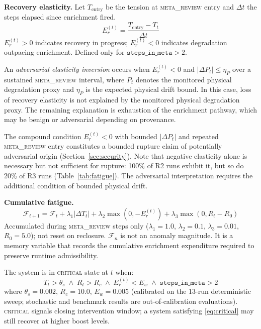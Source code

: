 \documentclass{llncs}
\newcommand{\st}[1]{\textup{\textsc{#1}}}
\begin{document}
\textbf{Recovery elasticity.}
Let $T_{\mathrm{entry}}$ be the tension at \st{meta\_review} entry and
$\Delta t$ the steps elapsed since enrichment fired.
\begin{equation}
  E_r^{(t)} = \frac{T_{\mathrm{entry}} - T_t}{\Delta t}
  \label{eq:elast}
\end{equation}
$E_r^{(t)} > 0$ indicates recovery in progress; $E_r^{(t)} < 0$
indicates degradation outpacing enrichment. Defined only for
$\mathtt{steps\_in\_meta} > 2$.

\begin{definition}
\label{def:aei}
An \emph{adversarial elasticity inversion} occurs when $E_r^{(t)} < 0$
and $|\Delta P_t| \leq \eta_P$ over a sustained \st{meta\_review}
interval, where $P_t$ denotes the monitored physical degradation proxy
and $\eta_P$ is the expected physical drift bound. In this case, loss of
recovery elasticity is not explained by the monitored physical
degradation proxy. The remaining explanation is exhaustion of the
enrichment pathway, which may be benign or adversarial depending on
provenance.
\end{definition}

The compound condition $E_r^{(t)} < 0$ with bounded $|\Delta P_t|$ and
repeated \st{meta\_review} entry constitutes a bounded rupture claim of
potentially adversarial origin (Section~\ref{sec:security}). Note that
negative elasticity alone is necessary but not sufficient for rupture:
100\% of R2 runs exhibit it, but so do 20\% of R3 runs
(Table~\ref{tab:fatigue}). The adversarial interpretation requires the
additional condition of bounded physical drift.

\textbf{Cumulative fatigue.}
\begin{equation}
  \mathcal{F}_{t+1} = \mathcal{F}_t
    + \lambda_1 |\Delta T_t|
    + \lambda_2 \max(0, -E_r^{(t)})
    + \lambda_3 \max(0, R_t - R_0)
  \label{eq:fatigue}
\end{equation}
Accumulated during \st{meta\_review} steps only
($\lambda_1 = 1.0$, $\lambda_2 = 0.1$, $\lambda_3 = 0.01$,
$R_0 = 5.0$); not reset on reclosure. \(\mathcal{F}_n\) is not an anomaly magnitude. It is a memory variable
that records the cumulative enrichment expenditure required to preserve
runtime admissibility.

\begin{definition}[\st{critical} forecast]
\label{def:critical}
The system is in \st{critical} state at $t$ when:
\begin{equation}
  \dot{T}_t > \theta_s
  \;\land\;
  R_t > R_c
  \;\land\;
  E_r^{(t)} < E_w
  \;\land\;
  \mathtt{steps\_in\_meta} > 2
  \label{eq:critical}
\end{equation}
where $\theta_s = 0.002$, $R_c = 10.0$, $E_w = 0.005$ (calibrated on
the 13-run deterministic sweep; stochastic and benchmark results are
out-of-calibration evaluations). \st{critical} signals closing intervention
window; a system satisfying \eqref{eq:critical} may still recover at higher
boost levels.
\end{definition}
\end{document}
